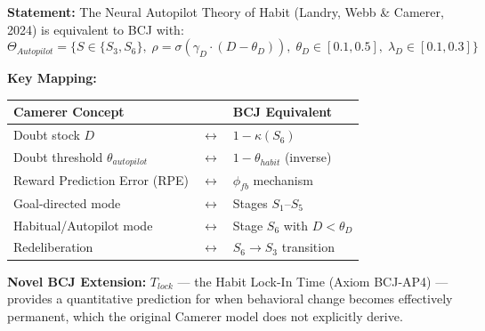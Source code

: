 \begin{tcolorbox}[colback=green!5!white, colframe=green!75!black,
    title=Theorem BCJ-T14: Neural Autopilot as Special Case]
\textbf{Statement:} The Neural Autopilot Theory of Habit (Landry, Webb \& Camerer, 2024) is equivalent to BCJ with:
\begin{equation}
\Theta_{Autopilot} = \{S \in \{S_3, S_6\}, \; \rho = \sigma(\gamma_D \cdot (D - \theta_D)), \; \theta_D \in [0.1, 0.5], \; \lambda_D \in [0.1, 0.3]\}
\end{equation}

\textbf{Key Mapping:}
\begin{center}
\begin{tabular}{lcl}
\toprule
\textbf{Camerer Concept} & & \textbf{BCJ Equivalent} \\
\midrule
Doubt stock $D$ & $\leftrightarrow$ & $1 - \kappa(S_6)$ \\
Doubt threshold $\theta_{autopilot}$ & $\leftrightarrow$ & $1 - \theta_{habit}$ (inverse) \\
Reward Prediction Error (RPE) & $\leftrightarrow$ & $\phi_{fb}$ mechanism \\
Goal-directed mode & $\leftrightarrow$ & Stages $S_1$--$S_5$ \\
Habitual/Autopilot mode & $\leftrightarrow$ & Stage $S_6$ with $D < \theta_D$ \\
Redeliberation & $\leftrightarrow$ & $S_6 \to S_3$ transition \\
\bottomrule
\end{tabular}
\end{center}

\textbf{Novel BCJ Extension:} $T_{lock}$ --- the Habit Lock-In Time (Axiom BCJ-AP4) --- provides a quantitative prediction for when behavioral change becomes effectively permanent, which the original Camerer model does not explicitly derive.
\end{tcolorbox}


